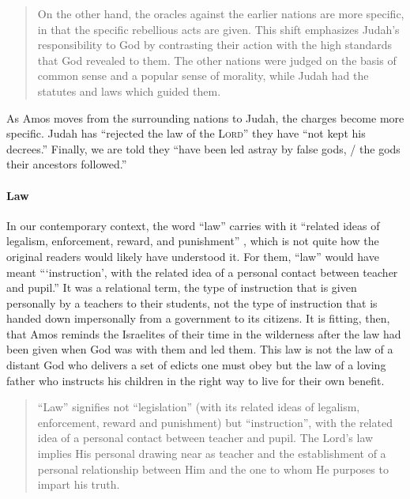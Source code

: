 \begin{quote}
    On the other hand, the oracles against the earlier nations are more
    specific, in that the specific rebellious acts are given. This shift
    emphasizes Judah's responsibility to God by contrasting their action with
    the high standards that God revealed to them. The other nations were judged
    on the basis of common sense and a popular sense of morality, while Judah
    had the statutes and laws which guided them.
    \autocite[115]{smith:2017}
\end{quote}

As Amos moves from the surrounding nations to Judah, the charges become more
specific. Judah has \enquote{rejected the law of the \textsc{Lord}} they have
\enquote{not kept his decrees.} Finally, we are told they \enquote{have been led
astray by false gods, / the gods their ancestors followed.}

\paragraph{Law} In our contemporary context, the word \enquote{law} carries with
it \enquote{related ideas of legalism, enforcement, reward, and punishment}
\autocite[54]{motyer:2011}, which is not quite how the original readers would
likely have understood it. For them, \enquote{law} would have meant
\enquote{\enquote{instruction}, with the related idea of a personal contact
between teacher and pupil.} It was a relational term, the type of instruction
that is given personally by a teachers to their students, not the type of
instruction that is handed down impersonally from a government to its citizens.
It is fitting, then, that Amos reminds the Israelites of their time in the
wilderness after the law had been given when God was with them and led them.
This law is not the law of a distant God who delivers a set of edicts one must
obey but the law of a loving father who instructs his children in the right way
to live for their own benefit.

\begin{quote}
    \enquote{Law} signifies not \enquote{legislation} (with its related ideas of
    legalism, enforcement, reward and punishment) but \enquote{instruction},
    with the related idea of a personal contact between teacher and pupil. The
    Lord's law implies His personal drawing near as teacher and the
    establishment of a personal relationship between Him and the one to whom He
    purposes to impart his truth.
    \autocite[54]{motyer:2011}
\end{quote}

